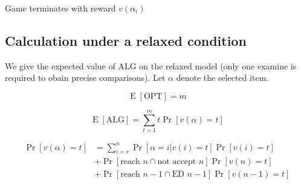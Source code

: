 \begin{algorithm}[H]
\caption{Game Process, Relaxed}
\label{algo1} 
\begin{algorithmic}[1]







		\State Game terminates with reward $v(\alpha_i)$
			
		
	\EndIf
	
	
\EndFor

\end{algorithmic}
\end{algorithm}


\subsection{Calculation under a relaxed condition}


We give the expected value of $\text{ALG}$ on the relaxed model (only one examine is required to obain precise comparisons). Let $\alpha$ denote the selected item.

\begin{equation}
  \operatorname{E}\left[\text{OPT}\right]=m
\end{equation}

\begin{equation}
  \operatorname{E}[ \text{ALG} ]=\sum_{t=1}^m t\operatorname{Pr}\left[{v(\alpha)=t}\right]
\end{equation}

\begin{align}
  \operatorname{Pr}\left[{v(\alpha)=t}\right] &= \sum_{i=r}^n
  \operatorname{Pr}\left[{\alpha = i | v(i)=t}\right]
  \operatorname{Pr}\left[{v(i)=t}\right]\\&+
  \operatorname{Pr}\left[{\text{reach }n \cap \text{not accept }n}\right] \operatorname{Pr}\left[{v(n)=t}\right]\\&+
  \operatorname{Pr}\left[{\text{reach }n-1 \cap \text{ED }n-1}\right]\operatorname{Pr}\left[{v(n-1)=t}\right]
\end{align}

